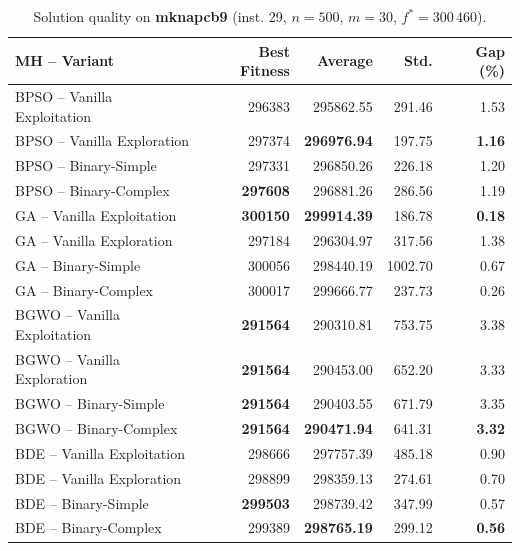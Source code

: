 \documentclass[journal,article,submit,moreauthors]{Definitions/mdpi}
\begin{document}
\begin{table}[htbp]
  \centering
  \small
  \caption{Solution quality on \textbf{mknapcb9} (inst. 29, $n=500$, $m=30$, $f^*=300\,460$).}
  \label{tab:calidad_mknapcb9_29}
  \begin{tabular}{lrrrr}
    \toprule
    \textbf{MH -- Variant} &
    \textbf{Best Fitness} &
    \textbf{Average} &
    \textbf{Std.} &
    \textbf{Gap (\%)} \\
    \midrule
    BPSO -- Vanilla Exploitation &         296383 &        295862.55 & 291.46 &         1.53 \\
    BPSO -- Vanilla Exploration  &         297374 & \textbf{296976.94} & 197.75 & \textbf{1.16} \\
    BPSO -- Binary-Simple        &         297331 &        296850.26 & 226.18 &         1.20 \\
    BPSO -- Binary-Complex       & \textbf{297608} &        296881.26 & 286.56 &         1.19 \\
    \midrule
    GA -- Vanilla Exploitation   & \textbf{300150} & \textbf{299914.39} & 186.78 & \textbf{0.18} \\
    GA -- Vanilla Exploration    &         297184 &        296304.97 & 317.56 &         1.38 \\
    GA -- Binary-Simple          &         300056 &        298440.19 & 1002.70 &         0.67 \\
    GA -- Binary-Complex         &         300017 &        299666.77 & 237.73 &         0.26 \\
    \midrule
    BGWO -- Vanilla Exploitation & \textbf{291564} &        290310.81 & 753.75 &         3.38 \\
    BGWO -- Vanilla Exploration  & \textbf{291564} &        290453.00 & 652.20 &         3.33 \\
    BGWO -- Binary-Simple        & \textbf{291564} &        290403.55 & 671.79 &         3.35 \\
    BGWO -- Binary-Complex       & \textbf{291564} & \textbf{290471.94} & 641.31 & \textbf{3.32} \\
    \midrule
    BDE -- Vanilla Exploitation  &         298666 &        297757.39 & 485.18 &         0.90 \\
    BDE -- Vanilla Exploration   &         298899 &        298359.13 & 274.61 &         0.70 \\
    BDE -- Binary-Simple         & \textbf{299503} &        298739.42 & 347.99 &         0.57 \\
    BDE -- Binary-Complex        &         299389 & \textbf{298765.19} & 299.12 & \textbf{0.56} \\
    \bottomrule
  \end{tabular}
\end{table}
\end{document}
